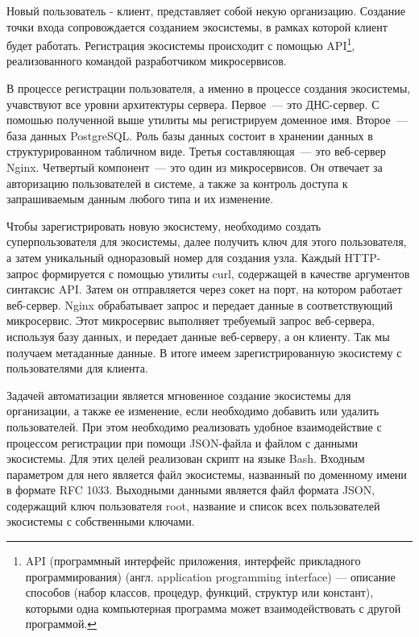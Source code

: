 Новый пользователь - клиент, представляет собой некую организацию. Создание точки входа сопровождается созданием экосистемы, в рамках которой клиент будет работать. 
Регистрация экосистемы происходит с помощью API\footnote{API (программный интерфейс приложения, интерфейс прикладного программирования) (англ. application programming interface) --- описание способов (набор классов, процедур, функций, структур или констант), которыми одна компьютерная программа может взаимодействовать с другой программой.}, реализованного командой разработчиком микросервисов.

В процессе регистрации пользователя, а именно в процессе создания экосистемы, учавствуют все уровни архитектуры сервера. Первое~--- это ДНС-сервер. С помошью полученной выше утилиты мы регистрируем доменное имя. Второе~--- база данных PostgreSQL. Роль базы данных состоит в хранении данных в структурированном табличном виде. Третья составляющая~--- это веб-сервер Nginx. Четвертый компонент~--- это один из микросервисов. Он отвечает за авторизацию пользователей в системе, а также за контроль доступа к запрашиваемым данным любого типа и их изменение.

Чтобы зарегистрировать новую экосистему, необходимо создать суперпользователя для экосистемы, далее получить ключ для этого пользователя, а затем уникальный одноразовый номер для создания узла. Каждый HTTP-запрос формируется с помощью утилиты curl, содержащей в качестве аргументов синтаксис API. Затем он отправляется через сокет на порт, на котором работает веб-сервер. Nginx обрабатывает запрос и передает данные в соответствующий микросервис. Этот микросервис выполняет требуемый запрос веб-сервера, используя базу данных, и передает данные веб-серверу, а он клиенту. Так мы получаем метаданные данные. В итоге имеем зарегистрированную экосистему с пользователями для клиента.

Задачей автоматизации является мгновенное создание экосистемы для организации, а также ее изменение, если необходимо добавить или удалить пользователей. При этом необходимо реализовать удобное взаимодействие с процессом регистрации при помощи JSON-файла и файлом с данными экосистемы. 
Для этих целей реализован скрипт на языке Bash. Входным параметром для него является файл экосистемы, названный по доменному имени в формате RFC 1033. Выходными данными является файл формата JSON, содержащий ключ пользователя root, название и список всех пользователей экосистемы с собственными ключами.

